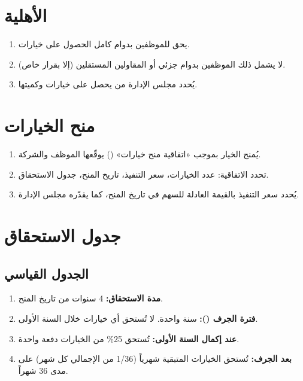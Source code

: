 \documentclass[11pt,a4paper]{article}
\begin{document}
\section{الأهلية}
\label{sec:eligibility}
\begin{enumerate}
    \item يحق للموظفين بدوام كامل الحصول على خيارات.
    \item لا يشمل ذلك الموظفين بدوام جزئي أو المقاولين المستقلين (إلا بقرار خاص).
    \item يُحدد مجلس الإدارة من يحصل على خيارات وكميتها.
\end{enumerate}

\section{منح الخيارات}
\label{sec:grant}
\begin{enumerate}
    \item يُمنح الخيار بموجب «اتفاقية منح خيارات» () يوقّعها الموظف والشركة.
    \item تحدد الاتفاقية: عدد الخيارات، سعر التنفيذ، تاريخ المنح، جدول الاستحقاق.
    \item يُحدد سعر التنفيذ بالقيمة العادلة للسهم في تاريخ المنح، كما يقدّره مجلس الإدارة.
\end{enumerate}

\section{جدول الاستحقاق}
\label{sec:vesting}

\subsection{الجدول القياسي}
\begin{enumerate}
    \item \textbf{مدة الاستحقاق:} 4 سنوات من تاريخ المنح.
    \item \textbf{فترة الجرف ():} سنة واحدة. لا تُستحق أي خيارات خلال السنة الأولى.
    \item \textbf{عند إكمال السنة الأولى:} تُستحق 25\% من الخيارات دفعة واحدة.
    \item \textbf{بعد الجرف:} تُستحق الخيارات المتبقية شهرياً (1/36 من الإجمالي كل شهر) على مدى 36 شهراً.
\end{enumerate}
\end{document}
